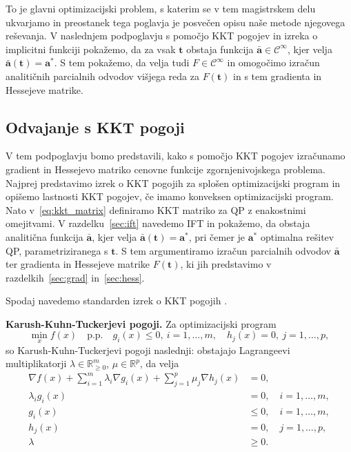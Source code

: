 \documentclass[isrm2, tisk]{fmfdelo}
\newcommand{\aimplicit}{\bar{\mathbf{a}}}
\newcommand{\avec}{\mathbf{a}}
\newcommand{\tvec}{\mathbf{t}}
\begin{document}
To je glavni optimizacijski problem, s katerim se v tem magistrskem delu ukvarjamo in preostanek tega poglavja je posvečen opisu naše metode njegovega reševanja. V naslednjem podpoglavju s pomočjo KKT pogojev in izreka o implicitni funkciji pokažemo, da za vsak $\tvec$ obstaja funkcija $\aimplicit \in \mathcal{C}^\infty$, kjer velja $\aimplicit(\tvec) = \mathbf{a}^*$. S tem pokažemo, da velja tudi $F \in \mathcal{C}^\infty$ in omogočimo izračun analitičnih parcialnih odvodov višjega reda za $F(\mathbf{t})$ in s tem gradienta in Hessejeve matrike.


\subsection{Odvajanje s \acs{KKT} pogoji}

V tem podpoglavju bomo predstavili, kako s pomočjo \ac{KKT} pogojev izračunamo gradient in Hessejevo matriko cenovne funkcije zgornjenivojskega problema. Najprej predstavimo izrek o \ac{KKT} pogojih za splošen optimizacijski program in opišemo lastnosti \ac{KKT} pogojev, če imamo konveksen optimizacijski program. Nato v~\eqref{eq:kkt_matrix} definiramo \acs{KKT} matriko za \ac{QP} z enakostnimi omejitvami. V razdelku~\ref{sec:ift} navedemo \acl{IFT} in pokažemo, da obstaja analitična funkcija $\aimplicit$, kjer velja $\aimplicit(\tvec) = \mathbf{a}^*$, pri čemer je $\avec^*$ optimalna rešitev \ac{QP}, parametriziranega s $\tvec$. S tem argumentiramo izračun parcialnih odvodov $\aimplicit$ ter gradienta in Hessejeve matrike $F(\tvec)$, ki jih predstavimo v razdelkih~\ref{sec:grad} in~\ref{sec:hess}.

Spodaj navedemo standarden izrek o \ac{KKT} pogojih \cite{bertsekas2016nonlinear}.

\textbf{Karush-Kuhn-Tuckerjevi pogoji.} Za optimizacijski program
\[
\min_x f(x) \quad \text{p.p.} \quad g_i(x) \leq 0, \ i=1,\dots,m, \quad h_j(x) = 0, \ j=1,\dots,p,
\]
so Karush-Kuhn-Tuckerjevi pogoji naslednji: obstajajo Lagrangeevi multiplikatorji $\lambda \in \mathbb{R}^m_{\geq 0}$, $\mu \in \mathbb{R}^p$, da velja
\begin{align}
\nabla f(x) + \sum_{i=1}^m \lambda_i \nabla g_i(x) + \sum_{j=1}^p \mu_j \nabla h_j(x) &= 0, \label{eq:kkt-stationarity} \\
\lambda_i g_i(x) &= 0, \quad i=1,\dots,m, \label{eq:kkt-complementarity} \\
g_i(x) &\leq 0, \quad i=1,\dots,m, \label{eq:kkt-primal-feasibility} \\
h_j(x) &= 0, \quad j=1,\dots,p, \label{eq:kkt-equality} \\
\lambda &\geq 0. \label{eq:kkt-dual-feasibility}
\end{align}
\end{document}

